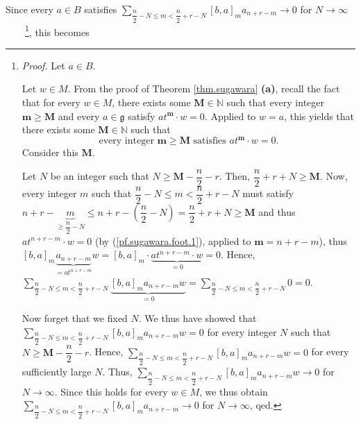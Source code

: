 \documentclass[etingof-lie.tex]{subfiles}
\begin{document}
Since every $a\in B$ satisfies $\sum\limits_{\dfrac{n}{2}-N\leq m<\dfrac{n}%
{2}+r-N}\left[  b,a\right]  _{m}a_{n+r-m}\rightarrow0$ for $N\rightarrow
\infty$\ \ \ \ \footnote{\textit{Proof.} Let $a\in B$.
\par
Let $w\in M$. From the proof of Theorem \ref{thm.sugawara} \textbf{(a)},
recall the fact that for every $w\in M$, there exists some $\mathbf{M}%
\in\mathbb{N}$ such that every integer $\mathbf{m}\geq\mathbf{M}$ and every
$a\in\mathfrak{g}$ satisfy $at^{\mathbf{m}}\cdot w=0$. Applied to $w=a$, this
yields that there exists some $\mathbf{M}\in\mathbb{N}$ such that%
\begin{equation}
\text{every integer }\mathbf{m}\geq\mathbf{M}\text{ satisfies }at^{\mathbf{m}%
}\cdot w=0. \label{pf.sugawara.foot.1}%
\end{equation}
Consider this $\mathbf{M}$.
\par
Let $N$ be an integer such that $N\geq\mathbf{M}-\dfrac{n}{2}-r$. Then,
$\dfrac{n}{2}+r+N\geq\mathbf{M}$. Now, every integer $m$ such that $\dfrac
{n}{2}-N\leq m<\dfrac{n}{2}+r-N$ must satisfy $n+r-\underbrace{m}_{\geq
\dfrac{n}{2}-N}\leq n+r-\left(  \dfrac{n}{2}-N\right)  =\dfrac{n}{2}%
+r+N\geq\mathbf{M}$ and thus $at^{n+r-m}\cdot w=0$ (by
(\ref{pf.sugawara.foot.1}), applied to $\mathbf{m}=n+r-m$), thus $\left[
b,a\right]  _{m}\underbrace{a_{n+r-m}}_{=at^{n+r-m}}w=\left[  b,a\right]
_{m}\cdot\underbrace{at^{n+r-m}\cdot w}_{=0}=0$. Hence, $\sum\limits_{\dfrac
{n}{2}-N\leq m<\dfrac{n}{2}+r-N}\underbrace{\left[  b,a\right]  _{m}%
a_{n+r-m}w}_{=0}=\sum\limits_{\dfrac{n}{2}-N\leq m<\dfrac{n}{2}+r-N}0=0$.
\par
Now forget that we fixed $N$. We thus have showed that $\sum\limits_{\dfrac
{n}{2}-N\leq m<\dfrac{n}{2}+r-N}\left[  b,a\right]  _{m}a_{n+r-m}w=0$ for
every integer $N$ such that $N\geq\mathbf{M}-\dfrac{n}{2}-r$. Hence,
$\sum\limits_{\dfrac{n}{2}-N\leq m<\dfrac{n}{2}+r-N}\left[  b,a\right]
_{m}a_{n+r-m}w=0$ for every sufficiently large $N$. Thus, $\sum\limits_{\dfrac
{n}{2}-N\leq m<\dfrac{n}{2}+r-N}\left[  b,a\right]  _{m}a_{n+r-m}%
w\rightarrow0$ for $N\rightarrow\infty$. Since this holds for every $w\in M$,
we thus obtain $\sum\limits_{\dfrac{n}{2}-N\leq m<\dfrac{n}{2}+r-N}\left[
b,a\right]  _{m}a_{n+r-m}\rightarrow0$ for $N\rightarrow\infty$, qed.}, this
becomes%
\end{document}
